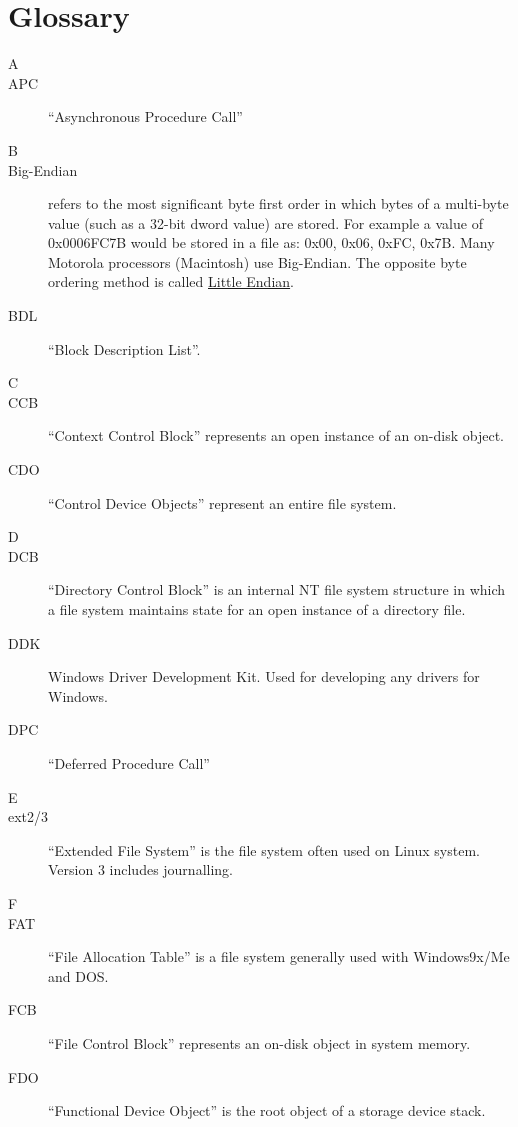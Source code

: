 \chapter{Glossary}
\label{cha:Glossary}

\begin{description}
\item[\Large{A}]
\item[APC] ``Asynchronous Procedure Call''

\item[\Large{B}]
\hypertarget{bendian}{}
\item[Big-Endian] refers to the most significant byte first order in which bytes of a multi-byte value (such as a 32-bit dword value) are stored. For example a value of 0x0006FC7B would be stored in a file as: 0x00, 0x06, 0xFC, 0x7B. Many Motorola processors (Macintosh) use Big-Endian. The opposite byte ordering method is called \hyperlink{lendian}{Little Endian}. 

\item[BDL] ``Block Description List''.

\item[\Large{C}]
\item[CCB] ``Context Control Block'' represents an open instance of an on-disk object.
\item[CDO] ``Control Device Objects'' represent an entire file system.

\item[\Large{D}]
\item[DCB] ``Directory Control Block'' is an internal NT file system structure in which a file system maintains state for an open instance of a directory file.
\item[DDK] Windows Driver Development Kit. Used for developing any drivers for Windows.
\item[DPC] ``Deferred Procedure Call''

\item[\Large{E}]

\item[ext2/3] ``Extended File System'' is the file system often used on Linux system. Version 3 includes journalling.

\item[\Large{F}]
\item[FAT] ``File Allocation Table'' is a file system generally used with Windows9x/Me and DOS.
\item[FCB] ``File Control Block'' represents an on-disk object in system memory.
\item[FDO] ``Functional Device Object'' is the root object of a storage device stack.


\end{description}
